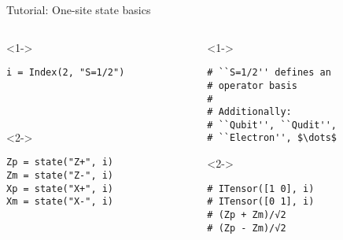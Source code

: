 \begin{frame}[fragile]{Tutorial: One-site state basics}

\begin{columns}

\begin{column}{4.5cm}

\begin{onlyenv}<1->

  \begin{lstlisting}[language=JuliaLocal, style=julia, basicstyle=\small]
  i = Index(2, "S=1/2")




  \end{lstlisting}

\end{onlyenv}

\begin{onlyenv}<2->

\begin{lstlisting}[language=JuliaLocal, style=julia, basicstyle=\small]
Zp = state("Z+", i)
Zm = state("Z-", i)
Xp = state("X+", i)
Xm = state("X-", i)
\end{lstlisting}

\end{onlyenv}

\end{column}

\begin{column}{4.5cm}

\begin{onlyenv}<1->

\begin{lstlisting}[style=julia, numbers=none, mathescape, basicstyle=\small]
# ``S=1/2'' defines an
# operator basis
#
# Additionally:
# ``Qubit'', ``Qudit'',
# ``Electron'', $\dots$
\end{lstlisting}

\end{onlyenv}

\begin{onlyenv}<2->

\begin{lstlisting}[style=julia, numbers=none, mathescape, basicstyle=\small]
# ITensor([1 0], i)
# ITensor([0 1], i)
# (Zp + Zm)/√2
# (Zp - Zm)/√2
\end{lstlisting}

\end{onlyenv}

\end{column}

\end{columns}

\end{frame}
